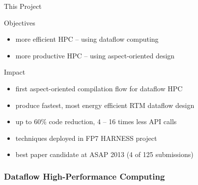 \begin{frame}{This Project}
  \begin{beamerboxesrounded}{Objectives}
    \begin{itemize}
    \item more efficient HPC -- using dataflow computing
    \item more productive HPC -- using aspect-oriented design
    \end{itemize}
  \end{beamerboxesrounded}
  \vspace{0.3cm}
  \begin{beamerboxesrounded}{Impact}
    \begin{itemize}
    \item first aspect-oriented compilation flow for dataflow HPC
    \item produce fastest, most energy efficient RTM dataflow design
    \item up to 60\% code reduction, 4 -- 16 times less API calls
    \item techniques deployed in FP7 HARNESS project
    \item best paper candidate at ASAP 2013 (4 of 125 submissions)
    \end{itemize}
  \end{beamerboxesrounded}
\end{frame}

\begin{frame}
  \frametitle{Dataflow High-Performance Computing}
  \begin{figure}[!ht]
    \centering
    \def\svgwidth{0.9\linewidth}
    
  \end{figure}
\end{frame}

